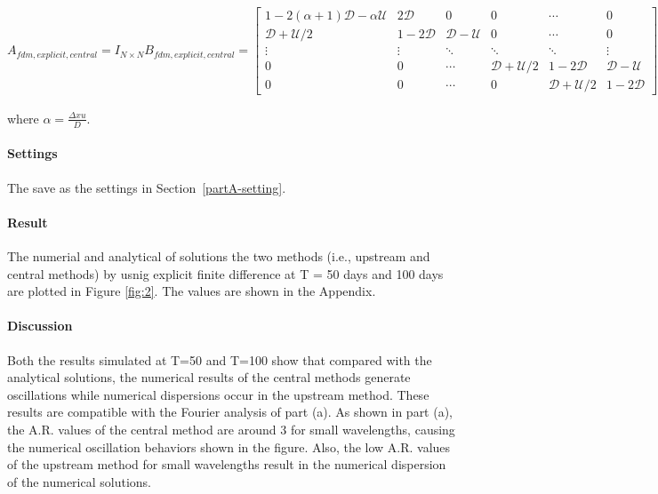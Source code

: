 \begin{subequations}
  \begin{equation}
    A_{fdm,explicit,central} = I_{N\times N}
  \end{equation}
  \begin{equation}
    B_{fdm,explicit,central} = \begin{bmatrix}
      1-2(\alpha +1)\mathcal{D}-\alpha\mathcal{U} & 2\mathcal{D} & 0 & 0 & \cdots & 0 \\
      \mathcal{D}+\mathcal{U}/2 & 1-2\mathcal{D} & \mathcal{D}-\mathcal{U} & 0 & \cdots & 0 \\
      \vdots & \vdots & \ddots & \ddots & \ddots & \vdots \\
      0 & 0 & \cdots & \mathcal{D}+\mathcal{U}/2 & 1-2\mathcal{D} & \mathcal{D}-\mathcal{U} \\
      0 & 0 & \cdots & 0 & \mathcal{D}+\mathcal{U}/2 & 1-2\mathcal{D}
      \end{bmatrix}_{N\times N}
  \end{equation}
  \begin{equation}
    b_{fdm,explicit,central} = \{\alpha(\mathcal{D}+\mathcal{U})c_{Feed}, 0, \dots, 0\}_{1\times N}^T
  \end{equation}
\end{subequations}

where $\alpha=\frac{\Delta xu}{D}$.

\paragraph{Settings} The save as the settings in Section~\ref{partA-setting}.

\paragraph{Result} The numerial and analytical of solutions the two methods (i.e., upstream and central methods) by usnig explicit finite difference at T = 50 days and 100 days are plotted in Figure \ref{fig:2}. The values are shown in the Appendix.

\paragraph{Discussion}\label{fdm-explicit-discussion} Both the results simulated at T=50 and T=100 show that compared with the analytical solutions, the numerical results of the central methods generate oscillations while numerical dispersions occur in the upstream method. These results are compatible with the Fourier analysis of part (a). As shown in part (a), the A.R. values of the central method are around 3 for small wavelengths, causing the numerical oscillation behaviors shown in the figure. Also, the low A.R. values of the upstream method for small wavelengths result in the numerical dispersion of the numerical solutions.

